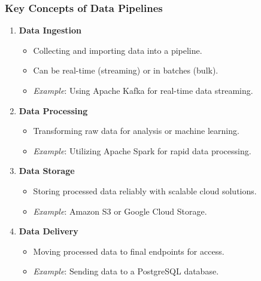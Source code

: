 \documentclass[aspectratio=169]{beamer}
\begin{document}
\begin{frame}[fragile]
    \frametitle{Key Concepts of Data Pipelines}
    \begin{enumerate}
        \item \textbf{Data Ingestion}
            \begin{itemize}
                \item Collecting and importing data into a pipeline.
                \item Can be real-time (streaming) or in batches (bulk).
                \item \textit{Example}: Using Apache Kafka for real-time data streaming.
            \end{itemize}
        \item \textbf{Data Processing}
            \begin{itemize}
                \item Transforming raw data for analysis or machine learning.
                \item \textit{Example}: Utilizing Apache Spark for rapid data processing.
            \end{itemize}
        \item \textbf{Data Storage}
            \begin{itemize}
                \item Storing processed data reliably with scalable cloud solutions.
                \item \textit{Example}: Amazon S3 or Google Cloud Storage.
            \end{itemize}
        \item \textbf{Data Delivery}
            \begin{itemize}
                \item Moving processed data to final endpoints for access.
                \item \textit{Example}: Sending data to a PostgreSQL database.
            \end{itemize}
    \end{enumerate}
\end{frame}
\end{document}
